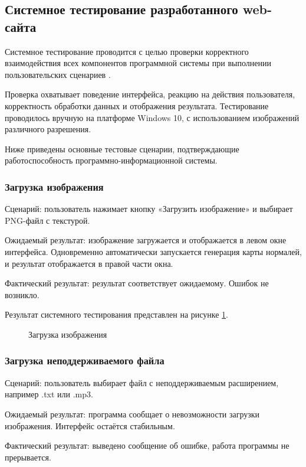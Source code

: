\subsection{Системное тестирование разработанного web-сайта}

Системное тестирование проводится с целью проверки корректного взаимодействия всех компонентов программной системы при выполнении пользовательских сценариев \cite{sharma2023}.

Проверка охватывает поведение интерфейса, реакцию на действия пользователя, корректность обработки данных и отображения результата. Тестирование проводилось вручную на платформе Windows 10, с использованием изображений различного разрешения.

Ниже приведены основные тестовые сценарии, подтверждающие работоспособность программно-информационной системы.

\subsubsection{Загрузка изображения}

Сценарий: пользователь нажимает кнопку «Загрузить изображение» и выбирает PNG-файл с текстурой.

Ожидаемый результат: изображение загружается и отображается в левом окне интерфейса. Одновременно автоматически запускается генерация карты нормалей, и результат отображается в правой части окна.

Фактический результат: результат соответствует ожидаемому. Ошибок не возникло.

Результат системного тестирования представлен на рисунке \ref{testsave:image}.

\begin{figure}[H]
	\caption{Загрузка изображения}
	\label{testsave:image}
\end{figure}

\subsubsection{Загрузка неподдерживаемого файла}

Сценарий: пользователь выбирает файл с неподдерживаемым расширением, например .txt или .mp3.

Ожидаемый результат: программа сообщает о невозможности загрузки изображения. Интерфейс остаётся стабильным.

Фактический результат: выведено сообщение об ошибке, работа программы не прерывается.


